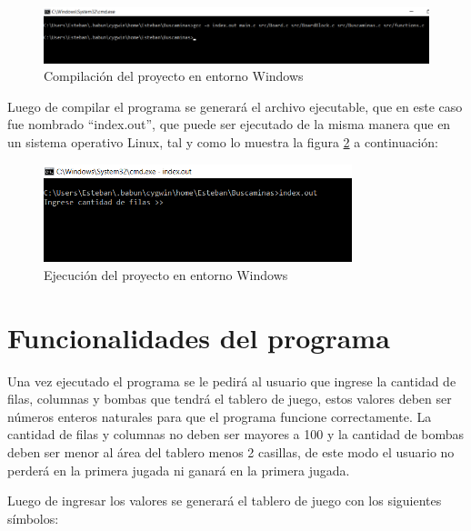 \documentclass[letterpaper,12pt]{report}
\begin{document}
\begin{figure}[H]
    \centering
    \includegraphics[width=1\textwidth]{gccWin.png}
    \caption{Compilación del proyecto en entorno Windows}
    \label{fig:gccWin}
\end{figure}

Luego de compilar el programa se generará el archivo ejecutable, que en este caso fue nombrado ``index.out'', que puede ser ejecutado de la misma manera que en un sistema operativo Linux, tal y como lo muestra la figura \ref{fig:ejecWin} a continuación:

\begin{figure}[H]
    \centering
    \includegraphics[width=0.8\textwidth]{ejecWin.png}
    \caption{Ejecución del proyecto en entorno Windows}
    \label{fig:ejecWin}
\end{figure}

\chapter{Funcionalidades del programa}

Una vez ejecutado el programa se le pedirá al usuario que ingrese la cantidad de filas, columnas y bombas que tendrá el tablero de juego, estos valores deben ser números enteros naturales para que el programa funcione correctamente. La cantidad de filas y columnas no deben ser mayores a 100 y la cantidad de bombas deben ser menor al área del tablero menos 2 casillas, de este modo el usuario no perderá en la primera jugada ni ganará en la primera jugada.

Luego de ingresar los valores se generará el tablero de juego con los siguientes símbolos:
\end{document}
